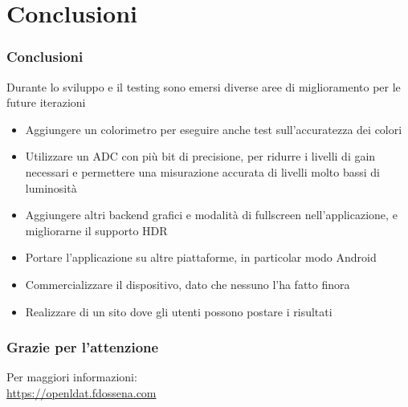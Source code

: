 \documentclass[xcolor={x11names}]{beamer}
\begin{document}
\section{Conclusioni}
\begin{frame}
	\frametitle{Conclusioni}
	Durante lo sviluppo e il testing sono emersi diverse aree di miglioramento per le future iterazioni
	\begin{itemize}
		\item Aggiungere un \alert{colorimetro} per eseguire anche test sull'accuratezza dei colori
		\item Utilizzare un \alert{ADC con più bit} di precisione, per ridurre i livelli di gain necessari e permettere una misurazione accurata di livelli molto bassi di luminosità
		\item Aggiungere \alert{altri backend grafici e modalità di fullscreen} nell'applicazione, e \alert{migliorarne il supporto HDR}
		\item \alert{Portare l'applicazione} su altre piattaforme, in particolar modo Android
		\item \alert{Commercializzare il dispositivo}, dato che nessuno l'ha fatto finora
		\item Realizzare di un sito dove gli utenti possono postare i risultati
	\end{itemize}
\end{frame}
\begin{frame}
	\frametitle{Grazie per l'attenzione}
	\centering
	Per maggiori informazioni:\\
	\alert{\url{https://openldat.fdossena.com}}
\end{frame}
\end{document}
